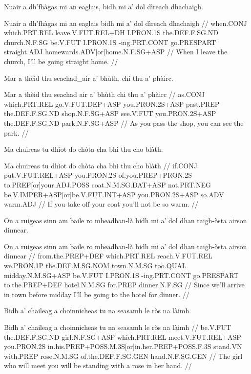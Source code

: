 \documentclass[a4paper,10pt]{article}
\begin{document}
\ex
\begingl
\glpre Nuair a dh'fhàgas mi an eaglais, bidh mi a' dol dìreach dhachaigh. 

\vspace{4mm}
\gla Nuair a dh'fhàgas mi an eaglais bidh mi a' dol dìreach dhachaigh  //
\glb when.CONJ which.PRT.REL leave.V.FUT.REL+DH I.PRON.1S the.DEF.F.SG.ND church.N.F.SG be.V.FUT I.PRON.1S -ing.PRT.CONT go.PRESPART straight.ADJ homewards.ADV[or]home.N.F.SG+ASP  //
\glft When I leave the church, I'll be going straight home. //
\endgl
\xe

\ex
\begingl
\glpre Mar a thèid thu seachad\_air a' bhùth, chi thu a' phàirc. 

\vspace{4mm}
\gla Mar a thèid thu {seachad air} a' bhùth chi thu a' phàirc  //
\glb as.CONJ which.PRT.REL go.V.FUT.DEP+ASP you.PRON.2S+ASP past.PREP the.DEF.F.SG.ND shop.N.F.SG+ASP see.V.FUT you.PRON.2S+ASP the.DEF.F.SG.ND park.N.F.SG+ASP  //
\glft As you pass the shop, you can see the park. //
\endgl
\xe

\ex
\begingl
\glpre Ma chuireas tu dhìot do chòta cha bhi thu cho blàth. 

\vspace{4mm}
\gla Ma chuireas tu dhìot do chòta cha bhi thu cho blàth  //
\glb if.CONJ put.V.FUT.REL+ASP you.PRON.2S of.you.PREP+PRON.2S to.PREP[or]your.ADJ.POSS coat.N.M.SG.DAT+ASP not.PRT.NEG be.V.IMPER+ASP[or]be.V.FUT.INT+ASP you.PRON.2S+ASP so.ADV warm.ADJ  //
\glft If you take off your coat you'll not be so warm. //
\endgl
\xe

\ex
\begingl
\glpre On a ruigeas sinn am baile ro mheadhan-là bidh mi a' dol dhan taigh-òsta airson dìnnear. 

\vspace{4mm}
\gla On a ruigeas sinn am baile ro mheadhan-là bidh mi a' dol dhan taigh-òsta airson dìnnear  //
\glb from.the.PREP+DEF which.PRT.REL reach.V.FUT.REL we.PRON.1P the.DEF.M.SG.NOM town.N.M.SG too.QUAL midday.N.M.SG+ASP be.V.FUT I.PRON.1S -ing.PRT.CONT go.PRESPART to.the.PREP+DEF hotel.N.M.SG for.PREP dinner.N.F.SG  //
\glft Since we'll arrive in town before midday I'll be going to the hotel for dinner. //
\endgl
\xe

\ex
\begingl
\glpre Bidh a' chaileag a choinnicheas tu na seasamh le ròs na làimh. 

\vspace{4mm}
\gla Bidh a' chaileag a choinnicheas tu na seasamh le ròs na làimh  //
\glb be.V.FUT the.DEF.F.SG.ND girl.N.F.SG+ASP which.PRT.REL meet.V.FUT.REL+ASP you.PRON.2S in.his.PREP+POSS.M.3S[or]in.her.PREP+POSS.F.3S stand.VN with.PREP rose.N.M.SG of.the.DEF.F.SG.GEN hand.N.F.SG.GEN  //
\glft The girl who will meet you will be standing with a rose in her hand. //
\endgl
\xe
\end{document}
